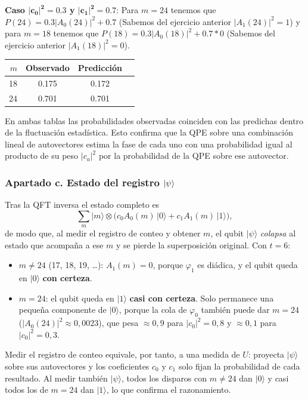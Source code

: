 \textbf{Caso $\mathbf{|c_0|^2 = 0.3}$ y $\mathbf{|c_1|^2 = 0.7}$}: Para $m = 24$ tenemos que $P(24) = 0.3|A_0(24)|^2 + 0.7$ (Sabemos del ejercicio anterior 
$|A_1(24)|^2 = 1$) y para $m = 18$ tenemos que $P(18) = 0.3|A_0(18)|^2 + 0.7*0$ (Sabemos del ejercicio anterior 
$|A_1(18)|^2 = 0$). 
\begin{table}[h]
  \centering
  \begin{tabular}{@{}rccc@{}}
    \toprule
    $m$ & Observado & Predicción \\
    \midrule
    18 & 0.175 & 0.172\\
    24 & 0.701 & 0.701\\
    \bottomrule
  \end{tabular}
  \label{tab:bloque5_e2_4_c0_30perc}
\end{table}

En ambas tablas las probabilidades observadas coinciden con las predichas dentro de la
fluctuación estadística. Esto confirma que la QPE sobre una combinación lineal de autovectores
estima la fase de cada uno con una probabilidad igual al producto de su peso $|c_a|^2$ por
la probabilidad de la QPE sobre ese autovector.

\subsubsection{Apartado c. Estado del registro \texorpdfstring{$\ket{\psi}$}{psi}}
Tras la QFT inversa el estado completo es
\begin{equation*}
  \sum_m |m\rangle \otimes \big( c_0 A_0(m)\,|0\rangle + c_1 A_1(m)\,|1\rangle \big),
\end{equation*}
de modo que, al medir el registro de conteo y obtener $m$, el qubit $|\psi\rangle$
\emph{colapsa} al estado que acompaña a ese $m$ y se pierde la superposición original.
Con $t=6$:
\begin{itemize}
  \item $m \neq 24$ (17, 18, 19, \dots): $A_1(m) = 0$, porque $\varphi_1$ es diádica, y el
        qubit queda en $|0\rangle$ \textbf{con certeza}.
  \item $m = 24$: el qubit queda en $|1\rangle$ \textbf{casi con certeza}. Solo permanece
        una pequeña componente de $|0\rangle$, porque la cola de $\varphi_0$ también puede
        dar $m=24$ ($|A_0(24)|^2 \approx 0{,}0023$), que pesa $\approx 0{,}9$ para
        $|c_0|^2 = 0{,}8$ y $\approx 0{,}1$ para $|c_0|^2 = 0{,}3$.
\end{itemize}
Medir el registro de conteo equivale, por tanto, a una medida de $U$: proyecta
$|\psi\rangle$ sobre sus autovectores y los coeficientes $c_0$ y $c_1$ solo fijan la
probabilidad de cada resultado. Al medir también $|\psi\rangle$, todos los disparos con
$m \neq 24$ dan $|0\rangle$ y casi todos los de $m = 24$ dan $|1\rangle$, lo que confirma
el razonamiento.